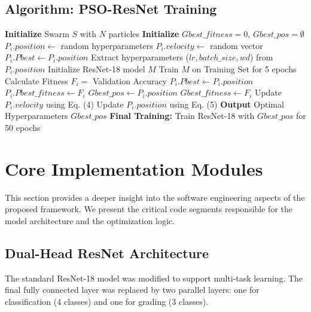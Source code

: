 \documentclass[journal]{IEEEtran}
\begin{document}
\subsection{Algorithm: PSO-ResNet Training}
\begin{algorithm}
\caption{PSO-Optimized ResNet Training}
\begin{algorithmic}[1]
\STATE \textbf{Initialize} Swarm $S$ with $N$ particles
\STATE \textbf{Initialize} $Gbest\_fitness = 0$, $Gbest\_pos = \emptyset$
    \STATE $P_i.position \leftarrow$ random hyperparameters
    \STATE $P_i.velocity \leftarrow$ random vector
    \STATE $P_i.Pbest \leftarrow P_i.position$
\ENDFOR
{}
        \STATE Extract hyperparameters ($lr, batch\_size, wd$) from $P_i.position$
        \STATE Initialize ResNet-18 model $M$
        \STATE Train $M$ on Training Set for 5 epochs
        \STATE Calculate Fitness $F_i = $ Validation Accuracy
            \STATE $P_i.Pbest \leftarrow P_i.position$
            \STATE $P_i.Pbest\_fitness \leftarrow F_i$
        \ENDIF
            \STATE $Gbest\_pos \leftarrow P_i.position$
            \STATE $Gbest\_fitness \leftarrow F_i$
        \ENDIF
    \ENDFOR
        \STATE Update $P_i.velocity$ using Eq. (4)
        \STATE Update $P_i.position$ using Eq. (5)
    \ENDFOR
\ENDWHILE
\STATE \textbf{Output} Optimal Hyperparameters $Gbest\_pos$
\STATE \textbf{Final Training:} Train ResNet-18 with $Gbest\_pos$ for 50 epochs
\end{algorithmic}
\end{algorithm}

\section{Core Implementation Modules}

This section provides a deeper insight into the software engineering aspects of the proposed framework. We present the critical code segments responsible for the model architecture and the optimization logic.

\subsection{Dual-Head ResNet Architecture}
The standard ResNet-18 model was modified to support multi-task learning. The final fully connected layer was replaced by two parallel layers: one for classification (4 classes) and one for grading (3 classes).
\end{document}
